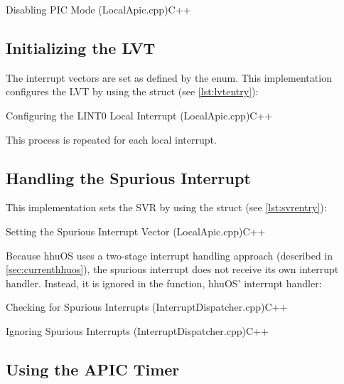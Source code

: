 \begin{codeblock}{Disabling PIC Mode (LocalApic.cpp)}{C++}
\end{codeblock}

\subsection{Initializing the LVT}
\label{subsec:apxlvtinit}

The interrupt vectors are set as defined by the  enum.
This implementation configures the LVT by using the  struct (see \autoref{lst:lvtentry}):

\begin{codeblock}{Configuring the LINT0 Local Interrupt (LocalApic.cpp)}{C++}
\end{codeblock}

This process is repeated for each local interrupt.

\subsection{Handling the Spurious Interrupt}
\label{subsec:apxsvr}

This implementation sets the SVR by using the  struct (see \autoref{lst:svrentry}):

\begin{codeblock}{Setting the Spurious Interrupt Vector (LocalApic.cpp)}{C++}
\end{codeblock}

Because hhuOS uses a two-stage interrupt handling approach (described in \autoref{sec:currenthhuos}), the spurious interrupt does not receive its own interrupt handler.
Instead, it is ignored in the  function, hhuOS'  interrupt handler:

\begin{codeblock}{Checking for Spurious Interrupts (InterruptDispatcher.cpp)}{C++}
\end{codeblock}

\begin{codeblock}{Ignoring Spurious Interrupts (InterruptDispatcher.cpp)}{C++}
\end{codeblock}

\subsection{Using the APIC Timer}
\label{subsec:apxapictimer}

